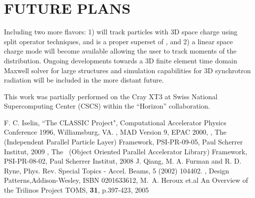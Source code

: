 \documentclass[acus]{JAC2003}
\begin{document}
\vspace{-4mm}
\section{FUTURE PLANS}
Including  two more flavors: 1) \opalmap will track particles with 3D space charge using split operator techniques, and is a proper superset of \madninep \cite{mad9}, and 2)  
a linear space charge mode will become available allowing the user to track moments of the distribution. 
Ongoing  developments towards a 3D finite element time domain Maxwell solver for large structures and simulation capabilities for 3D synchrotron radiation will be included in the more distant future.

This work was partially performed on the Cray XT3 at Swiss National Supercomputing Center (CSCS) within the ``Horizon'' collaboration. 
\begin{thebibliography}{9}   %
 {F. C. Iselin}, {``The CLASSIC Project"}, {Computational Accelerator Physics Conference 1996, Williamsburg, VA.}
,{ MAD Version 9}, { EPAC 2000},
, {The \ippl(Independent Parallel Particle Layer) Framework}, PSI-PR-09-05, Paul Scherrer Institut, 2009	
, { The \opal\ (Object Oriented Parallel Accelerator Library) Framework}, PSI-PR-08-02, Paul Scherrer Institut, 2008
 J. Qiang, M. A. Furman and R. D. Ryne, {Phys. Rev. Special Topics - Accel. Beams, 5 (2002) 104402.}
, {Design Patterns},{Addison-Wesley, ISBN {0201633612}},
 {M.~A. Heroux et.al} { An Overview of the {T}rilinos Project}{ TOMS, {\bf 31}}, {p.397-423}, 2005 


\end{thebibliography}
\end{document}
